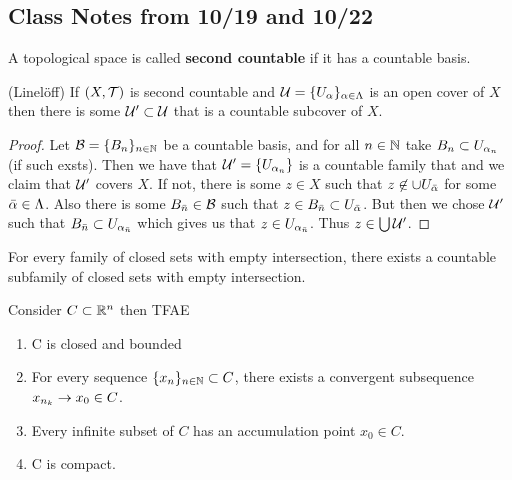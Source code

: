 \setcounter{section}{1019}
\setcounter{thm}{0}
\subsection{Class Notes from 10/19 and 10/22}\nl


\vs

\dfn A topological space is called \textbf{second countable} if it has a countable basis.

\vs

\begin{thm}(Linel\"off) If $(X, \mathcal{T})$ is second countable and $\mathcal{U} = \{U_\alpha\}_{\alpha\in \Lambda}$ is an open cover of $X$ then there is some $\mathcal{U}^\prime\subset \mathcal{U}$ that is a countable subcover of $X$.
\end{thm}

\begin{proof}
Let $\mathcal{B} = \{B_n\}_{n\in \mathbb{N}}$ be a countable basis, and for all $n\in \mathbb{N}$ take $B_n \subset U_{\alpha_n}$ (if such exsts). Then we have that $\mathcal{U}^\prime = \{U_{\alpha_n}\}$ is a countable family that and we claim that $\mathcal{U}^\prime$ covers $X$. If not, there is some $z\in X$ such that $z\not\in \cup U_{\bar {\alpha}}$ for some $\bar {\alpha} \in \Lambda$. Also there is some $B_{\bar n}\in \mathcal{B}$ such that $z\in B_{\bar n}\subset U_{\bar {\alpha}}$. But then we chose $\mathcal{U}^\prime$ such that $B_{\bar n} \subset U_{\alpha_{\bar n}}$ which gives us that $z \in U_{\alpha_{\bar n}}$. Thus $z\in \bigcup \mathcal{U}^\prime$.
\end{proof}

\vs

\begin{thm}
For every family of closed sets with empty intersection, there exists a countable subfamily of closed sets with empty intersection.
\end{thm}

\vs
\begin{thm} Consider $C\subset \mathbb{R}^n$ then TFAE
\begin{enumerate}[\hspace{1em}(a)]
    \item C is closed and bounded
    \item For every sequence $\{x_n\}_{n\in \mathbb{N}} \subset C$, there exists a convergent subsequence $x_{n_k}\rightarrow x_0\in C$.
    \item Every infinite subset of $C$ has an accumulation point $x_0\in C$.
    \item C is compact.
\end{enumerate}
  
\end{thm}

